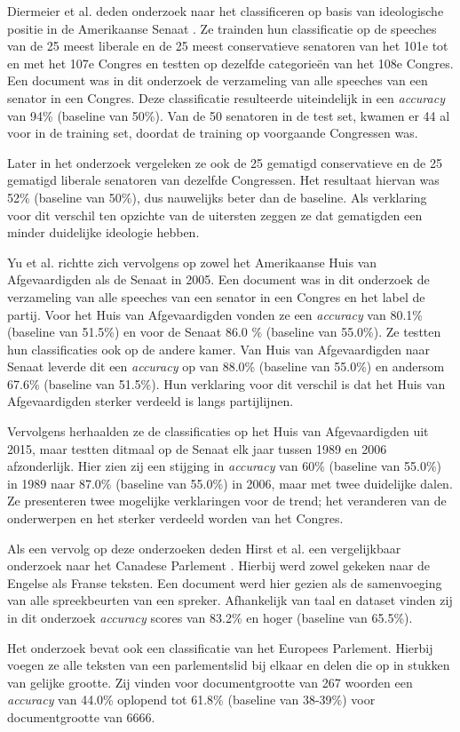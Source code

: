 Diermeier et al. deden onderzoek naar het classificeren op basis van ideologische positie in de Amerikaanse Senaat \cite{diermeier_godbout_yu_kaufmann_2012}. Ze trainden hun classificatie op de speeches van de 25 meest liberale en de 25 meest conservatieve senatoren van het 101e tot en met het 107e Congres en testten op dezelfde categorieën van het 108e Congres. Een document was in dit onderzoek de verzameling van alle speeches van een senator in een Congres. Deze classificatie resulteerde uiteindelijk in een \textit{accuracy} van 94\% (baseline van 50\%). Van de 50 senatoren in de test set, kwamen er 44 al voor in de training set, doordat de training op voorgaande Congressen was.\par
Later in het onderzoek vergeleken ze ook de 25 gematigd conservatieve  en de 25 gematigd liberale senatoren van dezelfde Congressen. Het resultaat hiervan was 52\% (baseline van 50\%), dus nauwelijks beter dan de baseline. Als verklaring voor dit verschil ten opzichte van de uitersten zeggen ze dat gematigden een minder duidelijke ideologie hebben.\par
Yu et al. \cite{doi:10.1080/19331680802149608} richtte zich vervolgens op zowel het Amerikaanse Huis van Afgevaardigden als de Senaat in 2005. Een document was in dit onderzoek de verzameling van alle speeches van een senator in een Congres en het label de partij. Voor het Huis van Afgevaardigden vonden ze een \textit{accuracy} van 80.1\% (baseline van 51.5\%) en voor de Senaat 86.0 \% (baseline van 55.0\%). Ze testten hun classificaties ook op de andere kamer. Van Huis van Afgevaardigden naar Senaat leverde dit een \textit{accuracy} op van 88.0\% (baseline van 55.0\%) en andersom 67.6\% (baseline van 51.5\%). Hun verklaring voor dit verschil is dat het Huis van Afgevaardigden sterker verdeeld is langs partijlijnen.\par
Vervolgens herhaalden ze de classificaties op het Huis van Afgevaardigden uit 2015, maar testten ditmaal op de Senaat elk jaar tussen 1989 en 2006 afzonderlijk. Hier zien zij een stijging in \textit{accuracy} van 60\% (baseline van 55.0\%) in 1989 naar 87.0\% (baseline van 55.0\%) in 2006, maar met twee duidelijke dalen. Ze presenteren twee mogelijke verklaringen voor de trend; het veranderen van de onderwerpen en het sterker verdeeld worden van het Congres. \par
Als een vervolg op deze onderzoeken deden Hirst et al. een vergelijkbaar onderzoek naar het Canadese Parlement \cite{Hirst_textto}. Hierbij werd zowel gekeken naar de Engelse als Franse teksten. Een document werd hier gezien als de samenvoeging van alle spreekbeurten van een spreker. Afhankelijk van taal en dataset vinden zij in dit onderzoek \textit{accuracy} scores van 83.2\%  en hoger (baseline van 65.5\%).\par
Het onderzoek bevat ook een classificatie van het Europees Parlement. Hierbij voegen ze alle teksten van een parlementslid bij elkaar en delen die op in stukken van gelijke grootte. Zij vinden voor documentgrootte van 267 woorden een \textit{accuracy} van 44.0\% oplopend tot 61.8\% (baseline van 38-39\%) voor documentgrootte van 6666.\par

